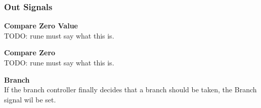 \subsubsection{Out Signals}

\begin{description}
\item{\textbf{Compare Zero Value}} \\

TODO: rune must say what this is.

\item{\textbf{Compare Zero}} \\

TODO: rune must say what this is.

\item{\textbf{Branch}} \\

If the branch controller finally decides that a branch should be taken, the Branch signal wil be set.

\end{description}
